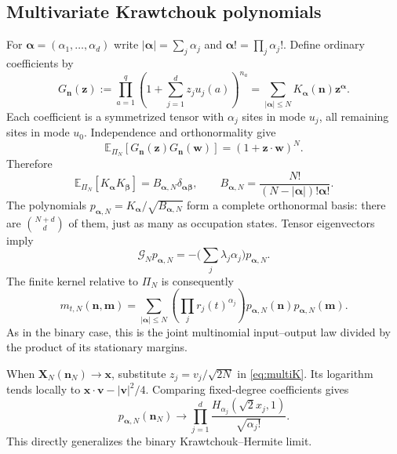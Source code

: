 \documentclass[11pt,reqno]{amsart}
\theoremstyle{definition}
\theoremstyle{remark}
\begin{document}
\subsection{Multivariate Krawtchouk polynomials}
For $\boldsymbol\alpha=(\alpha_1,\ldots,\alpha_d)$ write
$|\boldsymbol\alpha|=\sum_j\alpha_j$ and
$\boldsymbol\alpha!=\prod_j\alpha_j!$. Define ordinary coefficients by
\begin{equation}\label{eq:multiK}
G_{\mathbf n}(\mathbf z):=\prod_{a=1}^q
\left(1+\sum_{j=1}^dz_ju_j(a)\right)^{n_a}
=\sum_{|\boldsymbol\alpha|\le N}K_{\boldsymbol\alpha}(\mathbf n)
\mathbf z^{\boldsymbol\alpha}.
\end{equation}
Each coefficient is a symmetrized tensor with $\alpha_j$ sites in mode
$u_j$, all remaining sites in mode $u_0$. Independence and
orthonormality give
\[
\mathbb E_{\Pi_N}[G_{\mathbf n}(\mathbf z)G_{\mathbf n}(\mathbf w)]
=(1+\mathbf z\cdot\mathbf w)^N.
\]
Therefore
\begin{equation}\label{eq:multiorth}
\mathbb E_{\Pi_N}[K_{\boldsymbol\alpha}K_{\boldsymbol\beta}]
=B_{\boldsymbol\alpha,N}\delta_{\boldsymbol\alpha\boldsymbol\beta},
\qquad B_{\boldsymbol\alpha,N}=
\frac{N!}{(N-|\boldsymbol\alpha|)!\boldsymbol\alpha!}.
\end{equation}
The polynomials $p_{\boldsymbol\alpha,N}=K_{\boldsymbol\alpha}/
\sqrt{B_{\boldsymbol\alpha,N}}$ form a complete orthonormal basis:
there are $\binom{N+d}{d}$ of them, just as many as occupation states.
Tensor eigenvectors imply
\[
\mathcal G_Np_{\boldsymbol\alpha,N}
=-\Big(\sum_j\lambda_j\alpha_j\Big)p_{\boldsymbol\alpha,N}.
\]
The finite kernel relative to $\Pi_N$ is consequently
\begin{equation}\label{eq:multifinite}
m_{t,N}(\mathbf n,\mathbf m)=\sum_{|\boldsymbol\alpha|\le N}
\left(\prod_j r_j(t)^{\alpha_j}\right)
p_{\boldsymbol\alpha,N}(\mathbf n)p_{\boldsymbol\alpha,N}(\mathbf m).
\end{equation}
As in the binary case, this is the joint multinomial input--output
law divided by the product of its stationary margins.

When $\mathbf X_N(\mathbf n_N)\to\mathbf x$, substitute
$z_j=v_j/\sqrt{2N}$ in \eqref{eq:multiK}. Its logarithm tends locally
to $\mathbf x\cdot\mathbf v-|\mathbf v|^2/4$. Comparing fixed-degree
coefficients gives
\begin{equation}\label{eq:multiKH}
p_{\boldsymbol\alpha,N}(\mathbf n_N)\longrightarrow
\prod_{j=1}^d\frac{H_{\alpha_j}(\sqrt2x_j,1)}{\sqrt{\alpha_j!}}.
\end{equation}
This directly generalizes the binary Krawtchouk--Hermite limit.
\end{document}
